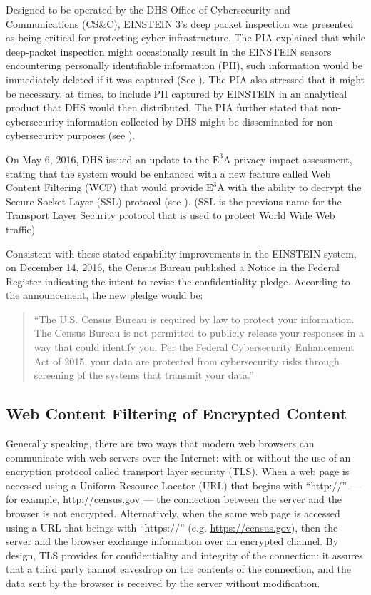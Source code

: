 \documentclass[fleqn,10pt]{wlscirep}
\newcommand{\ETA}{$\textrm{E}^\textrm{3}\textrm{A}$\xspace}
\begin{document}
Designed to be operated by the DHS Office of Cybersecurity and
Communications (CS\&C), EINSTEIN 3's deep packet inspection was
presented as being critical for protecting cyber infrastructure. The
PIA explained that while deep-packet inspection might occasionally
result in the EINSTEIN sensors encountering personally identifiable
information (PII), such information would be immediately deleted if it
was captured (See ). The PIA also stressed that it
might be necessary, at times, to include PII captured by EINSTEIN in
an analytical product that DHS would then distributed. The PIA further
stated that non-cybersecurity information collected by DHS might be
disseminated for non-cybersecurity purposes (see ).

On May 6, 2016, DHS issued an update to the \ETA privacy impact
assessment, stating that the system would be enhanced with a new
feature called Web Content Filtering (WCF) that would provide \ETA
with the ability to decrypt the Secure Socket Layer (SSL) protocol
(see ). (SSL is the
previous name for the Transport Layer Security protocol that is used
to protect World Wide Web traffic)

Consistent with these stated capability improvements in the EINSTEIN
system, on December 14, 2016, the Census Bureau published a Notice in
the Federal Register indicating the intent to revise the
confidentiality pledge.\cite{federal-register-2016-12-14} According to
the announcement, the new pledge would be:

\begin{quote}
  ``The U.S. Census Bureau is required by law to protect your
  information. The Census Bureau is not permitted to publicly release
  your responses in a way that could identify you. Per the Federal
  Cybersecurity Enhancement Act of 2015, your data are protected from
  cybersecurity risks through screening of the systems that transmit
  your data.''\cite{federal-register-2016-12-14,pledge}
\end{quote}

\subsection{Web Content Filtering of Encrypted Content}

Generally speaking, there are two ways that modern web browsers can
communicate with web servers over the Internet: with or without the
use of an encryption protocol called transport layer security
(TLS). When a web page is accessed using a Uniform Resource Locator
(URL) that begins with ``http://'' --- for example,
\url{http://census.gov} --- the connection between the server and the
browser is not encrypted. Alternatively, when the same web page is
accessed using a URL that beings with ``https://''
(e.g. \url{https://census.gov}), then the server and the browser
exchange information over an encrypted channel.  By design, TLS
provides for confidentiality and integrity of the connection: it
assures that a third party cannot eavesdrop on the contents of the
connection, and the data sent by the browser is received by the server
without modification.
\end{document}
